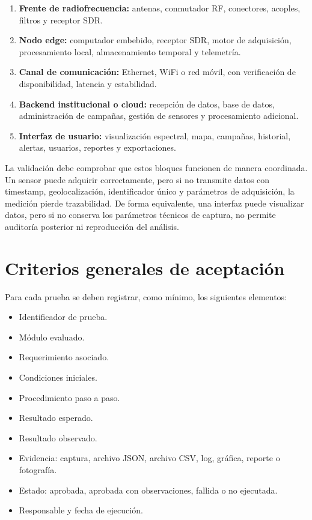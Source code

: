 \begin{enumerate}
    \item \textbf{Frente de radiofrecuencia:} antenas, conmutador RF, conectores, acoples, filtros y receptor SDR.
    \item \textbf{Nodo edge:} computador embebido, receptor SDR, motor de adquisición, procesamiento local, almacenamiento temporal y telemetría.
    \item \textbf{Canal de comunicación:} Ethernet, WiFi o red móvil, con verificación de disponibilidad, latencia y estabilidad.
    \item \textbf{Backend institucional o cloud:} recepción de datos, base de datos, administración de campañas, gestión de sensores y procesamiento adicional.
    \item \textbf{Interfaz de usuario:} visualización espectral, mapa, campañas, historial, alertas, usuarios, reportes y exportaciones.
\end{enumerate}

La validación debe comprobar que estos bloques funcionen de manera coordinada. Un sensor puede adquirir correctamente, pero si no transmite datos con timestamp, geolocalización, identificador único y parámetros de adquisición, la medición pierde trazabilidad. De forma equivalente, una interfaz puede visualizar datos, pero si no conserva los parámetros técnicos de captura, no permite auditoría posterior ni reproducción del análisis.

\section{Criterios generales de aceptación}

Para cada prueba se deben registrar, como mínimo, los siguientes elementos:

\begin{itemize}
    \item Identificador de prueba.
    \item Módulo evaluado.
    \item Requerimiento asociado.
    \item Condiciones iniciales.
    \item Procedimiento paso a paso.
    \item Resultado esperado.
    \item Resultado observado.
    \item Evidencia: captura, archivo JSON, archivo CSV, log, gráfica, reporte o fotografía.
    \item Estado: aprobada, aprobada con observaciones, fallida o no ejecutada.
    \item Responsable y fecha de ejecución.
\end{itemize}


